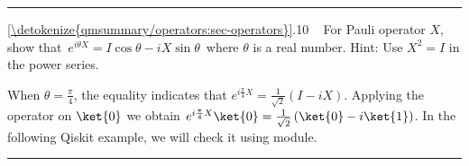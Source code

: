\documentclass[letterpaper,10pt,english]{jupyterBook}
\begin{document}
\bigskip\hrule\bigskip


\sphinxAtStartPar
{} \hyperref[\detokenize{qmsummary/operators:sec-operators}]{\ref{\detokenize{qmsummary/operators:sec-operators}}}.10     For Pauli operator \(X\), show that \(\,e^{i \theta X} = I \cos \theta - i X \sin \theta \,\) where \(\theta\) is a real number. Hint: Use \(X^2=I\) in the power series.

\sphinxAtStartPar
When \(\theta=\frac{\pi}{4}\), the equality indicates that \(e^{i \frac{\pi}{4} X} = \frac{1}{\sqrt{2}}  ( I - i X)\).  Applying the operator on \(\ket{0}\) we obtain \(e^{i \frac{\pi}{4} X}\ket{0} = \frac{1}{\sqrt{2}} \left (\ket{0}  - i \ket{1} \right)\).
In the following Qiskit example, we will check it using  module.


\bigskip\hrule\bigskip
\end{document}
